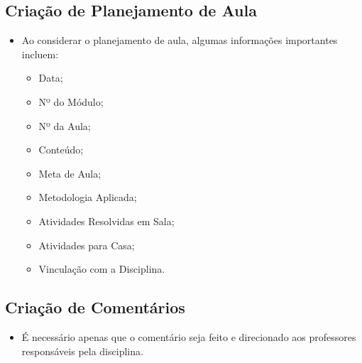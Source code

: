 \documentclass{article}
\begin{document}
\subsection{Criação de Planejamento de Aula}

\begin{itemize}
    \item Ao considerar o planejamento de aula, algumas informações importantes incluem:
    \begin{itemize}
        \item Data;
        \item Nº do Módulo;
        \item Nº da Aula;
        \item Conteúdo;
        \item Meta de Aula;
        \item Metodologia Aplicada;
        \item Atividades Resolvidas em Sala;
        \item Atividades para Casa;
        \item Vinculação com a Disciplina.
    \end{itemize}
\end{itemize}

\subsection{Criação de Comentários}
\begin{itemize}
    \item É necessário apenas que o comentário seja feito e direcionado aos professores responsáveis pela disciplina.
\end{itemize}
\end{document}
